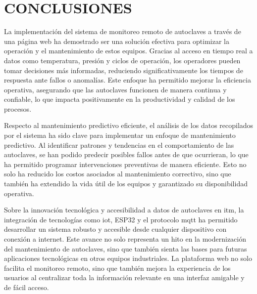 
\newpage
{} 

%
%

\section*{CONCLUSIONES}

La implementación del sistema de monitoreo remoto de autoclaves a través de una página web ha demostrado ser una solución efectiva para optimizar la operación y el mantenimiento de estos equipos. Gracias al acceso en tiempo real a datos como temperatura, presión y ciclos de operación, los operadores pueden tomar decisiones más informadas, reduciendo significativamente los tiempos de respuesta ante fallos o anomalías. Este enfoque ha permitido mejorar la eficiencia operativa, asegurando que las autoclaves funcionen de manera continua y confiable, lo que impacta positivamente en la productividad y calidad de los procesos.

Respecto al mantenimiento predictivo eficiente, el análisis de los datos recopilados por el sistema ha sido clave para implementar un enfoque de mantenimiento predictivo. Al identificar patrones y tendencias en el comportamiento de las autoclaves, se han podido predecir posibles fallos antes de que ocurrieran, lo que ha permitido programar intervenciones preventivas de manera eficiente. Esto no solo ha reducido los costos asociados al mantenimiento correctivo, sino que también ha extendido la vida útil de los equipos y garantizado su disponibilidad operativa.

Sobre la innovación tecnológica y accesibilidad a datos de autoclaves en \acrshort{itm}, la integración de tecnologías como \acrshort{iot}, ESP32 y el protocolo \acrshort{mqtt} ha permitido desarrollar un sistema robusto y accesible desde cualquier dispositivo con conexión a internet. Este avance no solo representa un hito en la modernización del mantenimiento de autoclaves, sino que también sienta las bases para futuras aplicaciones tecnológicas en otros equipos industriales. La plataforma web no solo facilita el monitoreo remoto, sino que también mejora la experiencia de los usuarios al centralizar toda la información relevante en una interfaz amigable y de fácil acceso.